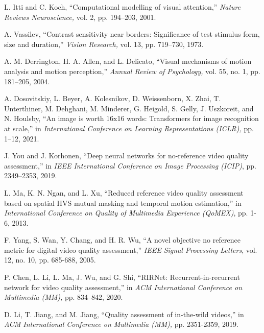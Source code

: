 \documentclass[journal]{IEEEtran}
\begin{document}
\begin{thebibliography}{5}
L. Itti and C. Koch, ``Computational modelling of visual attention,'' \emph{Nature Reviews Neuroscience,} vol. 2, pp. 194–203, 2001.

A. Vassilev, ``Contrast sensitivity near borders: Significance of test stimulus form, size and duration,'' \emph{Vision Research,} vol. 13, pp. 719–730, 1973.

A. M. Derrington, H. A. Allen, and L. Delicato, ``Visual mechanisms of motion analysis and motion perception,'' \emph{Annual Review of Psychology,} vol. 55, no. 1, pp. 181–205, 2004.

A. Dosovitskiy, L. Beyer, A. Kolesnikov, D. Weissenborn, X. Zhai, T. Unterthiner, M. Dehghani, M. Minderer, G. Heigold, S. Gelly, J. Uszkoreit, and N. Houlsby, ``An image is worth 16x16 words: Transformers for image recognition at scale,'' in \emph{International Conference on Learning Representations (ICLR),} pp. 1–12, 2021.







J. You and J. Korhonen, ``Deep neural networks for no-reference video quality assessment,'' in \emph{IEEE International Conference on Image Processing (ICIP)}, pp. 2349–2353, 2019.





L. Ma, K. N. Ngan, and L. Xu, ``Reduced reference video quality assessment based on spatial HVS mutual masking and temporal motion estimation,'' in \emph{International Conference on Quality of Multimedia Experience (QoMEX)}, pp. 1-6, 2013.



F. Yang, S. Wan, Y. Chang, and H. R. Wu, ``A novel objective no reference metric for digital video quality assessment,'' \emph{IEEE Signal Processing Letters}, vol. 12, no. 10, pp. 685-688, 2005.

P. Chen, L. Li, L. Ma, J. Wu, and G. Shi, ``RIRNet: Recurrent-in-recurrent network for video quality assessment,'' in \emph{ACM International Conference on Multimedia (MM),} pp. 834–842, 2020.



D. Li, T. Jiang, and M. Jiang, ``Quality assessment of in-the-wild videos,'' in \emph{ACM International Conference on Multimedia (MM),} pp. 2351-2359, 2019.


\end{thebibliography}
\end{document}
